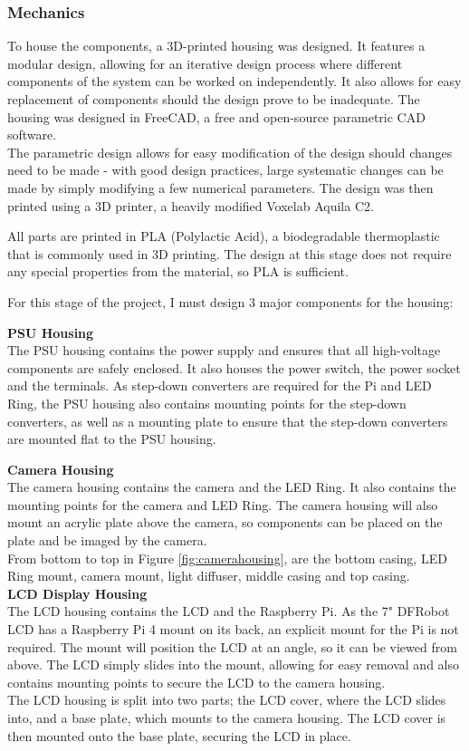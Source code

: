 \subsubsection{Mechanics} \label{sec:mechanics}
To house the components, a 3D-printed housing was designed. It features a modular design, allowing for an iterative design process
where different components of the system can be worked on independently. It also allows for easy replacement of components
should the design prove to be inadequate. The housing was designed in FreeCAD\cite{freecad}, a free and open-source parametric CAD software. \\
The parametric design allows for easy modification of the design should changes need to be made -
with good design practices, large systematic changes can be made by simply modifying a few numerical parameters.
The design was then printed using a 3D printer, a heavily modified Voxelab Aquila C2. 

All parts are printed in PLA (Polylactic Acid), a biodegradable thermoplastic that is commonly used in 3D printing. The design
at this stage does not require any special properties from the material, so PLA is sufficient.

For this stage of the project, I must design 3 major components for the housing:

\noindent
\textbf{PSU Housing} \\
The PSU housing contains the power supply and ensures that all high-voltage components are safely enclosed.
It also houses the power switch, the power socket and the terminals. As step-down converters are required for the Pi and LED Ring,
the PSU housing also contains mounting points for the step-down converters, as well as a mounting plate to ensure that the step-down converters
are mounted flat to the PSU housing.

\noindent
\textbf{Camera Housing}
\label{sec:camerahousing} \\
The camera housing contains the camera and the LED Ring. It also contains the mounting points for the camera and LED Ring.
The camera housing will also mount an acrylic plate above the camera, so components can be placed on the plate and be imaged by the camera. \\
From bottom to top in Figure \ref*{fig:camerahousing}, are the bottom casing, LED Ring mount, camera mount, light diffuser, middle casing and
top casing. \\

\noindent
\textbf{LCD Display Housing}
\label{sec:lcdhousing} \\
The LCD housing contains the LCD and the Raspberry Pi. As the 7" DFRobot LCD has a Raspberry Pi 4 mount on its back,
an explicit mount for the Pi is not required. The mount will position the LCD at an angle, so it can be viewed from above. The LCD
simply slides into the mount, allowing for easy removal and also contains mounting points to secure the LCD to the camera housing. \\
The LCD housing is split into two parts; the LCD cover, where the LCD slides into, and a base plate, which mounts to the camera housing.
The LCD cover is then mounted onto the base plate, securing the LCD in place.

